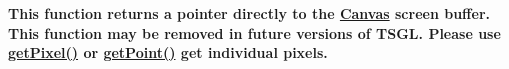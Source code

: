 
\begin{DoxyRefList}
\item[\label{deprecated__deprecated000001}%
\hypertarget{deprecated__deprecated000001}{}%
Member \hyperlink{classtsgl_1_1_canvas_a71f072dd82ca3b5cecfd65cde6d8a226}{tsgl\+:\+:Canvas\+:\+:get\+Screen\+Buffer} ()]{\bfseries This function returns a pointer directly to the \hyperlink{classtsgl_1_1_canvas}{Canvas}\textquotesingle{} screen buffer. This function may be removed in future versions of T\+S\+G\+L. Please use \hyperlink{classtsgl_1_1_canvas_a1f54dba4b09d248e2611f3409353c2c6}{get\+Pixel()} or \hyperlink{classtsgl_1_1_canvas_aa31883b3c9b09006cf82b270ad7a0a9f}{get\+Point()} get individual pixels. }
\end{DoxyRefList}